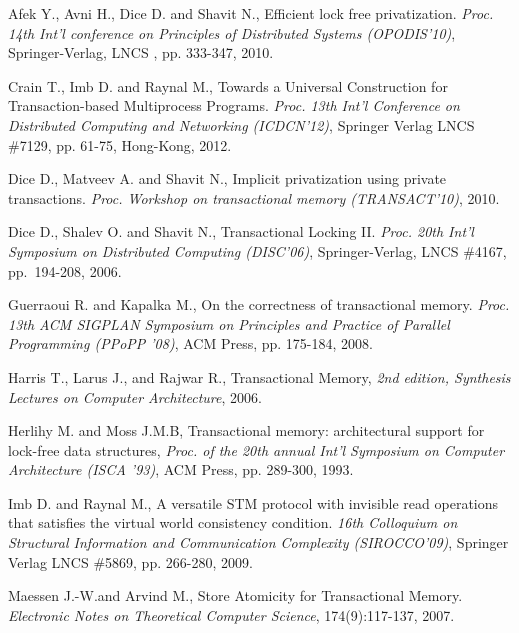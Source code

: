 \documentclass[11pt,letterpaper]{article}
\begin{document}
{\small 

\begin{thebibliography}{guerraoui08}


 Afek Y.,  Avni H.,   Dice D. and  Shavit N.,
Efficient lock free privatization. 
{\it Proc.  14th Int'l conference on Principles of Distributed Systems 
(OPODIS'10)}, Springer-Verlag,  LNCS , pp. 333-347, 2010. 



Crain T., Imb D. and Raynal M., 
Towards a Universal Construction for Transaction-based Multiprocess Programs.
{\it Proc. 13th Int'l Conference on Distributed Computing and Networking
(ICDCN'12)}, 
Springer Verlag LNCS \#7129, pp. 61-75, Hong-Kong,  2012. 



Dice D., Matveev A. and  Shavit N.,
 Implicit privatization using private transactions. 
{\it Proc. Workshop on transactional memory (TRANSACT'10)}, 2010.




Dice D., Shalev O. and Shavit N.,
Transactional Locking II.
{\em Proc. 20th Int'l Symposium on Distributed Computing (DISC'06)},
Springer-Verlag, LNCS \#4167, pp.~194-208, 2006.


Guerraoui R. and  Kapalka M.,  
 On the correctness of transactional memory. 
{\it  Proc. 13th ACM SIGPLAN Symposium on Principles and Practice of 
Parallel Programming (PPoPP '08)},  ACM Press, pp.  175-184, 2008.




 Harris T.,  Larus J., and  Rajwar R., 
Transactional Memory, 
{\it 2nd edition, Synthesis Lectures on Computer Architecture},  2006.




Herlihy M.  and Moss J.M.B,
 Transactional memory: architectural support for lock-free data structures, 
{\it Proc.  of the 20th annual Int'l Symposium on Computer Architecture 
(ISCA '93)}, ACM Press, pp. 289-300, 1993. 



Imb D. and Raynal M., 
A versatile   STM protocol with invisible read operations 
that satisfies  the  virtual world consistency condition.
{\it   16th  Colloquium   on  Structural   Information   and  Communication
Complexity  (SIROCCO'09)}, 
Springer Verlag LNCS   \#5869, pp. 266-280,  2009.


 Maessen J.-W.and Arvind M.,
 Store Atomicity for Transactional Memory. 
{\it Electronic  Notes  on Theoretical  Computer Science}, 
174(9):117-137, 2007.



\end{thebibliography}}
\end{document}
